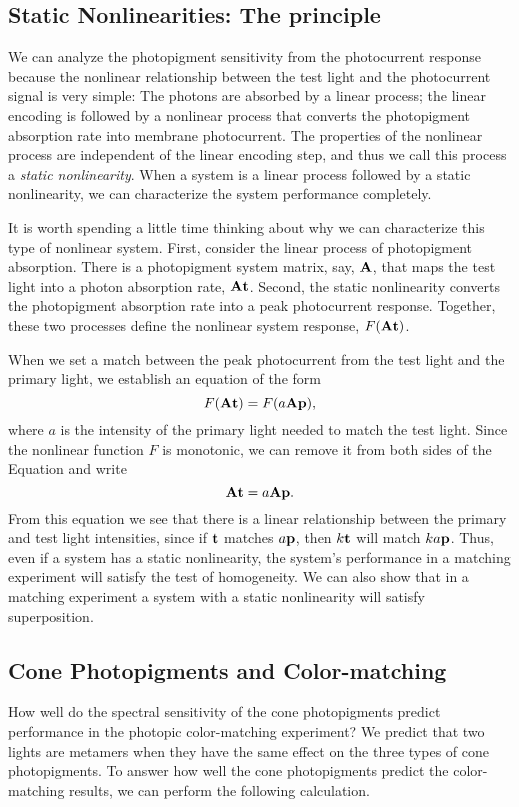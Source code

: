 \subsection*{Static Nonlinearities:  The principle}
We can analyze the photopigment sensitivity
from the photocurrent response because the 
nonlinear relationship between the test
light and the photocurrent signal is very simple:
The photons are absorbed
by a linear process;
the linear encoding is followed by a nonlinear process
that converts the photopigment absorption rate into
membrane photocurrent.
The properties of the nonlinear process
are independent of the linear encoding step, and thus
we call this process a {\em static nonlinearity}.
When a system is a linear process followed by a static
nonlinearity,
we can characterize the system performance completely.

It is worth spending a little time thinking about
why we can characterize this type of nonlinear system.
First, consider the linear process of photopigment absorption.
There is a photopigment system matrix, say, $\mbox{$\bf A$}$,
that maps the test light into a photon absorption rate,
$\mbox{$\bf A$} \mbox{${\bf t}$}$.
Second, the static nonlinearity converts the photopigment
absorption rate into a peak photocurrent response.
Together, these two processes define
the nonlinear system response, $F( \mbox{$\bf A$} \mbox{${\bf t}$} )$.

When we set a match between the peak photocurrent
from the test light and the primary light, we establish
an equation of the form
\begin{equation}
F( \mbox{$\bf A$} \mbox{${\bf t}$}) = F( a \mbox{$\bf A$} \mbox{$\bf p$} ),
\end{equation}
where $a$ is the intensity of the primary light
needed to match the test light.
Since the nonlinear function $F$ is monotonic,
we can remove it from both sides of the Equation and write
\begin{equation}
\label{e3:static.homogeneity}
\mbox{$\bf A$} \mbox{${\bf t}$} = a \mbox{$\bf A$} \mbox{$\bf p$} .
\end{equation}
From this equation we see that there is a linear relationship
between the primary and test light
intensities, since
if $\mbox{${\bf t}$}$ matches $a \mbox{$\bf p$}$, then $k \mbox{${\bf t}$}$ will
match $k a \mbox{$\bf p$}$.
Thus, even if a system has a static nonlinearity,
the system's performance in a matching experiment will
satisfy the test of homogeneity.
We can also show that in a matching experiment
a system with a static nonlinearity will satisfy superposition.

\subsection*{Cone Photopigments and Color-matching}
How well do the spectral sensitivity of the cone photopigments
predict performance in the photopic color-matching experiment?
We predict that two lights are metamers
when they have the same effect on the three types of cone
photopigments.
To answer how well the cone photopigments predict the
color-matching results, we can perform the following
calculation.

